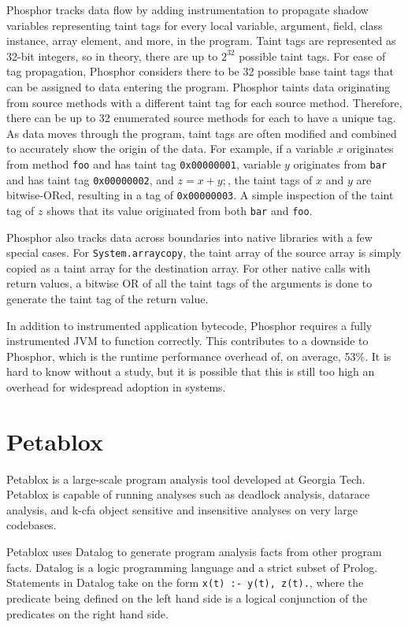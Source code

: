 Phosphor tracks data flow by adding instrumentation to propagate shadow variables representing taint tags for every local variable, argument, field, class instance, array element, and more, in the program. Taint tags are represented as 32-bit integers, so in theory, there are up to $2^{32}$ possible taint tags. For ease of tag propagation, Phosphor considers there to be 32 possible base taint tags that can be assigned to data entering the program. Phosphor taints data originating from source methods with a different taint tag for each source method. Therefore, there can be up to 32 enumerated source methods for each to have a unique tag. As data moves through the program, taint tags are often modified and combined to accurately show the origin of the data. For example, if a variable $x$ originates from method \texttt{foo} and has taint tag \texttt{0x00000001}, variable $y$ originates from \texttt{bar} and has taint tag \texttt{0x00000002}, and $z = x + y;$, the taint tags of $x$ and $y$ are bitwise-ORed, resulting in a tag of \texttt{0x00000003}. A simple inspection of the taint tag of $z$ shows that its value originated from both \texttt{bar} and \texttt{foo}.

Phosphor also tracks data across boundaries into native libraries with a few special cases. For \texttt{System.arraycopy}, the taint array of the source array is simply copied as a taint array for the destination array. For other native calls with return values, a bitwise OR of all the taint tags of the arguments is done to generate the taint tag of the return value.

In addition to instrumented application bytecode, Phosphor requires a fully instrumented JVM to function correctly. This contributes to a downside to Phosphor, which is the runtime performance overhead of, on average, 53\%. It is hard to know without a study, but it is possible that this is still too high an overhead for widespread adoption in systems.
\section{Petablox}
Petablox \cite{petablox} is a large-scale program analysis tool developed at Georgia Tech. Petablox is capable of running analyses such as deadlock analysis, datarace analysis, and k-cfa object sensitive and insensitive analyses on very large codebases.

Petablox uses Datalog \cite{datalog} to generate program analysis facts from other program facts. Datalog is a logic programming language and a strict subset of Prolog. Statements in Datalog take on the form \texttt{x(t) :- y(t), z(t).}, where the predicate being defined on the left hand side is a logical conjunction of the predicates on the right hand side.

